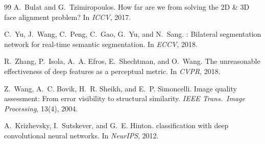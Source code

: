 \documentclass[10pt,twocolumn,letterpaper]{article}
\begin{document}
{\begin{thebibliography}{99}
A.~Bulat and G.~Tzimiropoulos.
\newblock How far are we from solving the {2D} \& {3D} face alignment problem?
\newblock In \emph{ICCV}, 2017.

C.~Yu, J.~Wang, C.~Peng, C.~Gao, G.~Yu, and N.~Sang.
: Bilateral segmentation network for real-time semantic segmentation.
\newblock In \emph{ECCV}, 2018.

R.~Zhang, P.~Isola, A.~A. Efros, E.~Shechtman, and O.~Wang.
\newblock The unreasonable effectiveness of deep features as a perceptual metric.
\newblock In \emph{CVPR}, 2018.

Z.~Wang, A.~C. Bovik, H.~R. Sheikh, and E.~P. Simoncelli.
\newblock Image quality assessment: From error visibility to structural similarity.
\newblock \emph{IEEE Trans.\ Image Processing}, 13(4), 2004.

A.~Krizhevsky, I.~Sutskever, and G.~E. Hinton.
 classification with deep convolutional neural networks.
\newblock In \emph{NeurIPS}, 2012.

\end{thebibliography}
}
\end{document}
